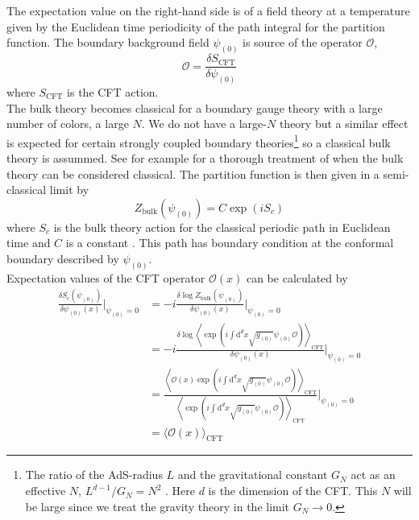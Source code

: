 \documentclass[12pt]{report}
\renewcommand{\d}{\ensuremath{\mathrm{d}}}
\renewcommand{\i}{\ensuremath{i}}
\begin{document}
The expectation value on the right-hand side is of a field theory at a temperature given by the Euclidean time periodicity of the path integral for the partition function. The boundary background field $\psi_{(0)}$ is source of the operator $\mathcal{O}$,
\begin{equation}
\mathcal{O}= \frac{\delta S_{\mathrm{CFT}}}{\delta \psi_{(0)}}
\end{equation}
 where $S_{\mathrm{CFT}}$ is the CFT action.\\%

The bulk theory becomes classical for a boundary gauge theory with a large number of colors, a large $N$. We do not have a large-$N$ theory but a similar effect is expected for certain strongly coupled boundary theories\footnote{The ratio of the AdS-radius $L$ and the gravitational constant $G_N$ act as an effective $N$, $L^{d-1}/G_N=N^2$ \cite{McGreevy:2009xe}. Here $d$ is the dimension of the CFT. This $N$ will be large since we treat the gravity theory in the limit $G_N\rightarrow 0$.} so a classical bulk theory is assummed. See for example \cite{McGreevy:2009xe} for a thorough treatment of when the bulk theory can be considered classical. The partition function is then given in a semi-classical limit by
\begin{equation}
 Z_{\mathrm{bulk}}(\psi_{(0)})=C\exp(\i S_c)\label{semi}
\end{equation}
where $S_c$ is the bulk theory action for the classical periodic path in Euclidean time and $C$ is a constant \cite{hartnoll8}. This path has boundary condition at the conformal boundary described by $\psi_{(0)}$.\\
Expectation values of the CFT operator $\mathcal{O}(x)$ can be calculated by
\begin{equation}
\begin{split}
\frac{\delta S_c(\psi_{(0)})}{\delta\psi_{(0)}(x)}|_{\psi_{(0)}=0}&=
-\i\frac{\delta\log Z_{\mathrm{bulk}}(\psi_{(0)})}{\delta\psi_{(0)}(x)}|_{\psi_{(0)}=0}\\
&=-\i\frac{\delta\log\left\langle\exp(\i\int\d^dx\sqrt{g_{(0)}}\psi_{(0)}\mathcal{O})\right\rangle_{\mathrm{CFT}}}{\delta\psi_{(0)}(x)}|_{\psi_{(0)}=0}\\
&=\frac{\left\langle\mathcal{O}(x)\exp(\i\int\d^dx\sqrt{g_{(0)}}\psi_{(0)}\mathcal{O})\right\rangle_{\mathrm{CFT}}}{\left\langle\exp(\i\int\d^dx\sqrt{g_{(0)}}\psi_{(0)}\mathcal{O})\right\rangle_{\mathrm{CFT}}}|_{\psi_{(0)}=0}\\
&=\langle \mathcal{O}(x) \rangle_{\mathrm{CFT}}
\end{split}
\end{equation}
\end{document}
